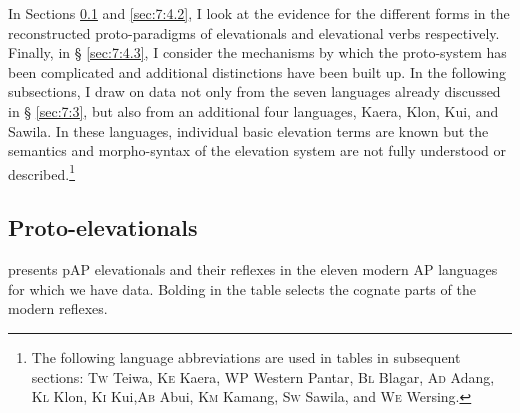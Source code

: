 In Sections \ref{sec:7:4.1} and \ref{sec:7:4.2}, I look at the evidence for the different forms in the reconstructed proto-paradigms of elevationals  and elevational verbs respectively. Finally, in {\S} \ref{sec:7:4.3}, I consider the mechanisms by which the proto-system has been complicated and additional distinctions have been built up. In the following subsections, I draw on data not only from the seven languages already discussed in {\S} \ref{sec:7:3}, but also from an additional four languages, Kaera, Klon, Kui, and Sawila. In these languages, individual basic elevation terms are known but the semantics and morpho-syntax of the elevation system are not fully understood or described.\footnote{The following language abbreviations are used in tables in subsequent sections: \textsc{Tw} Teiwa, \textsc{Ke} Kaera, \textsc{WP} Western Pantar, \textsc{Bl} Blagar, \textsc{Ad} Adang, \textsc{Kl} Klon, \textsc{Ki} Kui,\textsc{Ab}  Abui, \textsc{Km} Kamang, \textsc{Sw} Sawila, and \textsc{We} Wersing.} 

\subsection{Proto-elevationals}\label{sec:7:4.1}
 presents pAP elevationals and their reflexes in the eleven modern AP languages for which we have data. Bolding in the table selects the cognate parts of the modern reflexes.

\enlargethispage{-3em}
 


